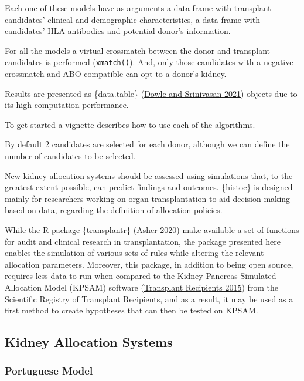 \documentclass[
]{article}
\begin{document}
Each one of these models have as arguments a data frame with transplant
candidates' clinical and demographic characteristics, a data frame with
candidates' HLA antibodies and potential donor's information.

For all the models a virtual crossmatch between the donor and transplant
candidates is performed (\texttt{xmatch()}). And, only those candidates
with a negative crossmatch and ABO compatible can opt to a donor's
kidney.

Results are presented as \{data.table\}
(\protect\hyperlink{ref-data.table}{Dowle and Srinivasan 2021}) objects
due to its high computation performance.

To get started a vignette describes
\href{https://txopen.github.io/histoc/articles/how_to.html}{how to use}
each of the algorithms.

By default 2 candidates are selected for each donor, although we can
define the number of candidates to be selected.

New kidney allocation systems should be assessed using simulations that,
to the greatest extent possible, can predict findings and outcomes.
\{histoc\} is designed mainly for researchers working on organ
transplantation to aid decision making based on data, regarding the
definition of allocation policies.

While the R package \{transplantr\}
(\protect\hyperlink{ref-transplantr}{Asher 2020}) make available a set
of functions for audit and clinical research in transplantation, the
package presented here enables the simulation of various sets of rules
while altering the relevant allocation parameters. Moreover, this
package, in addition to being open source, requires less data to run
when compared to the Kidney-Pancreas Simulated Allocation Model (KPSAM)
software (\protect\hyperlink{ref-srtr}{Transplant Recipients 2015}) from
the Scientific Registry of Transplant Recipients, and as a result, it
may be used as a first method to create hypotheses that can then be
tested on KPSAM.

\hypertarget{kidney-allocation-systems}{%
\subsection{Kidney Allocation Systems}\label{kidney-allocation-systems}}

\hypertarget{portuguese-model}{%
\subsubsection{Portuguese Model}\label{portuguese-model}}
\end{document}
